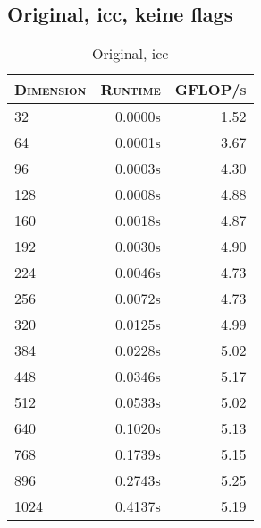 \begin{table}[!htb]
\caption{Original, icc}
\begin{minipage}{.5\linewidth}
\centering
\subsection{Original, icc, keine flags}
\begin{tabular}{|l|r|r|}
	\hline
	\textsc{Dimension} & \textsc{Runtime} & \textsc{GFLOP/s} \\
	\hline
	\hline
	32  &  0.0000s  & 1.52 \\ 
	\hline 
	64  &  0.0001s  & 3.67 \\ 
	\hline 
	96  &  0.0003s  & 4.30 \\ 
	\hline 
	128  &  0.0008s  & 4.88 \\ 
	\hline 
	160  &  0.0018s  & 4.87 \\ 
	\hline 
	192  &  0.0030s  & 4.90 \\ 
	\hline 
	224  &  0.0046s  & 4.73 \\ 
	\hline 
	256  &  0.0072s  & 4.73 \\ 
	\hline 
	320  &  0.0125s  & 4.99 \\ 
	\hline 
	384  &  0.0228s  & 5.02 \\ 
	\hline 
	448  &  0.0346s  & 5.17 \\ 
	\hline 
	512  &  0.0533s  & 5.02 \\ 
	\hline 
	640  &  0.1020s  & 5.13 \\ 
	\hline 
	768  &  0.1739s  & 5.15 \\ 
	\hline 
	896  &  0.2743s  & 5.25 \\ 
	\hline 
	1024  &  0.4137s  & 5.19 \\ 
	\hline 
\end{tabular}
\end{minipage}%
\begin{minipage}{.5\linewidth}
\centering

\end{minipage}
\end{table}
